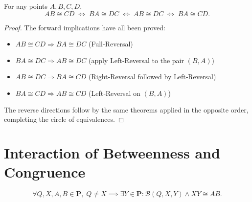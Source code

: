 \documentclass[../../../main/main.tex]{subfiles}
\begin{document}
\begin{theorem}
\label{thm:swap-inv}
For any points $A,B,C,D$,
\[
AB \cong CD \;\iff\; BA \cong DC \;\iff\; AB \cong DC \;\iff\; BA \cong CD .
\]
\end{theorem}
\begin{proof}
    The forward implications have all been proved:
    \begin{itemize}
        \item $AB \cong CD \Rightarrow BA \cong DC$ (Full-Reversal)
        \item $BA \cong DC \Rightarrow AB \cong DC$ (apply Left‑Reversal to the pair $(B,A)$)
        \item $AB \cong DC \Rightarrow BA \cong CD$ (Right‑Reversal followed by Left‑Reversal)
        \item $BA \cong CD \Rightarrow AB \cong CD$ (Left‑Reversal on $(B,A)$)
    \end{itemize}
    The reverse directions follow by the same theorems applied in the opposite order, completing the circle of equivalences.
\end{proof}

\section{Interaction of Betweenness and Congruence}

\begin{axiom}\label{ax:seg-construction}
    \[
    \forall Q, X, A, B \in \mathbf{P},\; Q \neq X \implies
    \exists Y \in \mathbf{P} \colon \mathcal{B}(Q,X,Y) \land XY \cong AB.
    \]
\end{axiom}
\end{document}
